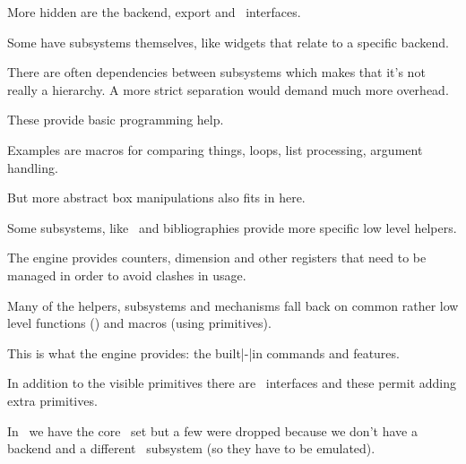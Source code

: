 \startitem
    More hidden are the backend, export and \XML\ interfaces.
\stopitem

\startitem
    Some have subsystems themselves, like widgets that relate to a specific
    backend.
\stopitem

\startitem
    There are often dependencies between subsystems which makes that it's not really a
    hierarchy. A more strict separation would demand much more overhead.
\stopitem

\stopitemize

\stoptitle


\starttitle[title=Helpers]

\startitemize

\startitem
    These provide basic programming help.
\stopitem

\startitem
    Examples are macros for comparing things, loops, list processing,
    argument handling.
\stopitem

\startitem
    But more abstract box manipulations also fits in here.
\stopitem

\startitem
    Some subsystems, like \XML\ and bibliographies provide more specific low
    level helpers.
\stopitem

\stopitemize

\stoptitle


\starttitle[title=Infrastructure]

\startitemize

\startitem
    The engine provides counters, dimension and other registers that need
    to be managed in order to avoid clashes in usage.
\stopitem

\startitem
    Many of the helpers, subsystems and mechanisms fall back on common rather
    low level functions (\LUA) and macros (using primitives).
\stopitem

\stopitemize

\stoptitle


\starttitle[title=Primitives]

\startitemize

\startitem
    This is what the engine provides: the built|-|in commands and features.
\stopitem

\startitem
    In addition to the visible primitives there are \LUA\ interfaces and these
    permit adding extra primitives.
\stopitem

\startitem
    In \LUAMETATEX\ we have the core \TEX\ set but a few were dropped because we
    don't have a backend and a different \IO\ subsystem (so they have to be
    emulated).
\stopitem

